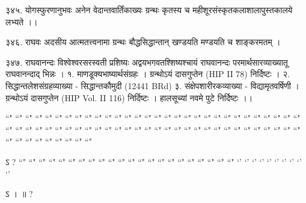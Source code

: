 ३४५. योगस्फुरणानुभवः
अनेन वेदान्तवार्तिंकाख्यः ग्रन्थः कृतस्य च महीशूरसंस्कृतकलाशालापुस्तकालये लभ्यते ।।

३४६. राघवः
अदसीय आत्मतत्त्वनामा ग्रन्थः बौद्धसिद्धान्तान् खण्डयति मण्डयति च शाङ्करमतम् ।

३४७. राघवानन्दः
विश्वेश्वरसरस्वती प्रशिष्यः अद्वयभगवतश्शिष्यश्चायं राघवानन्दः परमार्थसारव्याख्यातू राघवानन्दाद् भिन्नः ।
१. माणडूक्यभाष्यार्थसंग्रहः । ग्रन्थोऽयं दासगुप्तेन (HIP II 78) निर्दिष्टः ।
२. सिद्धान्तलेशसंग्रहव्याख्या - सिद्धान्तकौमुदी (12441 BRd)
३. संक्षेपशारीरकव्याख्या - विद्यामृतवर्षिणी । ग्रन्थोऽयं दासगुप्तेन (HIP Vol. II 116) निर्दिष्टः । हालसूच्यां नवमे पुटे निर्दिष्टः ।।


``" ``" ``" ``" ``" ``" ``" ``" ``" ``" ``" ``" ``" ``" ``" ``" ``" ``" ``" ``" ``" ``" ``" ``" ``" ``" ``" ``" ``" ``" ``" ``" ``" ``" ``" ``" ``" ``" ``" ``" ``" ``" ``" ``" ``" ``" ``" ``" ``" ``" ``" ``" ``" ``" ``" ``" ``" ``" ``" ``" ``" ``" ``" ``" ``" ``" ``" ``" ``"

ऽ  ?
``" ``" ``" ``" ``" ``" ``" ``" ``" ``" ``" ``" ``" ``" ``" ``" ``" ``" ``" ``" ``" ``"
`' `' `' `' `' `' `' `' `' `' 
 
ऽ  ।   ॥ ?
